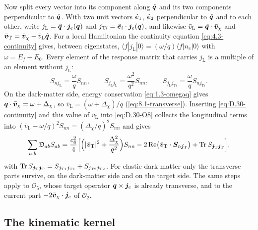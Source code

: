 Now split every vector into its component along $\hat{\bm{q}}$ and its two components perpendicular to $\hat{\bm{q}}$. With two unit vectors $\hat{\bm{e}}_1$, $\hat{\bm{e}}_2$ perpendicular to $\hat{\bm{q}}$ and to each other, write $j_{\mathrm{L}} = \hat{\bm{q}}\cdot\bm{j}_e(\bm{q})$ and $j_{\mathrm{T}i} = \hat{\bm{e}}_i\cdot\bm{j}_e(\bm{q})$, and likewise $\bar v_{\mathrm{L}} = \hat{\bm{q}}\cdot\bar{\bm{v}}_\chi$ and $\bar{\bm{v}}_{\mathrm{T}} = \bar{\bm{v}}_\chi - \bar v_{\mathrm{L}}\hat{\bm{q}}$. For a local Hamiltonian the continuity equation \cref{eq:4.3-continuity} gives, between eigenstates, $\langle f|j_{\mathrm{L}}|0\rangle = (\omega/q)\langle f|n_e|0\rangle$ with $\omega = E_f - E_0$. Every element of the response matrix that carries $j_{\mathrm{L}}$ is a multiple of an element without $j_{\mathrm{L}}$:
\begin{equation}
  S_{nj_{\mathrm{L}}} = \frac{\omega}{q}S_{nn} , \qquad S_{j_{\mathrm{L}}j_{\mathrm{L}}} = \frac{\omega^2}{q^2}S_{nn} , \qquad S_{j_{\mathrm{L}}j_{\mathrm{T}i}} = \frac{\omega}{q}S_{nj_{\mathrm{T}i}} .
  \label{eq:D.30-continuity}
\end{equation}
On the dark-matter side, energy conservation \cref{eq:1.3-omegaq} gives $\bm{q}\cdot\bar{\bm{v}}_\chi = \omega + \Delta_\chi$, so $\bar v_{\mathrm{L}} = (\omega + \Delta_\chi)/q$ (\cref{eq:8.1-transverse}). Inserting \cref{eq:D.30-continuity} and this value of $\bar v_{\mathrm{L}}$ into \cref{eq:D.30-O8} collects the longitudinal terms into $(\bar v_{\mathrm{L}} - \omega/q)^2S_{nn} = (\Delta_\chi/q)^2S_{nn}$ and gives
\begin{equation}
  \sum_{a,b}\mathfrak{D}_{ab}S_{ab} = \frac{c_8^2}{4}\Bigl[\Bigl(|\bar{\bm{v}}_{\mathrm{T}}|^2 + \frac{\Delta_\chi^2}{q^2}\Bigr)S_{nn} - 2\operatorname{Re}\bigl(\bar{\bm{v}}_{\mathrm{T}}\cdot\bm{S}_{n\bm{j}_{\mathrm{T}}}\bigr) + \operatorname{Tr} S_{\bm{j}_{\mathrm{T}}\bm{j}_{\mathrm{T}}}\Bigr] ,
  \label{eq:D.30-O8T}
\end{equation}
with $\operatorname{Tr} S_{\bm{j}_{\mathrm{T}}\bm{j}_{\mathrm{T}}} = S_{j_{\mathrm{T}1}j_{\mathrm{T}1}} + S_{j_{\mathrm{T}2}j_{\mathrm{T}2}}$. For elastic dark matter only the transverse parts survive, on the dark-matter side and on the target side. The same steps apply to $\mathcal{O}_5$, whose target operator $\bm{q}\times\bm{j}_e$ is already transverse, and to the current part $-2\bar{\bm{v}}_\chi\cdot\bm{j}_e$ of $\mathcal{O}_2$.

\subsection{The kinematic kernel}

